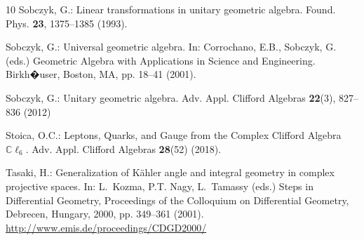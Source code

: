 \documentclass{birkjour}
\theoremstyle{definition}
\begin{document}
\begin{thebibliography}{10}
	Sobczyk, G.: Linear transformations in unitary geometric algebra.
	\newblock Found. Phys. \textbf{23}, 1375--1385 (1993).
	\newblock {}
	
	Sobczyk, G.: Universal geometric algebra.
	\newblock In: Corrochano, E.B., Sobczyk, G. (eds.) Geometric Algebra with Applications in Science and Engineering. Birkh�user, Boston, MA, pp. 18--41 (2001).
	
	Sobczyk, G.: Unitary geometric algebra.
	\newblock Adv. Appl. Clifford Algebras \textbf{22}(3), 827--836 (2012)
	
	Stoica, O.C.: Leptons, Quarks, and Gauge from the Complex Clifford Algebra $\mathbb {C}\ell _6$.
	\newblock Adv. Appl. Clifford Algebras \textbf{28}(52) (2018).
	\newblock {}
	
	Tasaki, H.: Generalization of {K}{\"a}hler angle and integral geometry in	complex projective spaces.
	\newblock In: L.~Kozma, P.T. Nagy, L.~Tamassy (eds.) Steps in Differential Geometry, Proceedings of the Colloquium on Differential Geometry, Debrecen, Hungary, 2000, pp. 349--361 (2001).
	\newblock \urlprefix\url{http://www.emis.de/proceedings/CDGD2000/}
	
	
\end{thebibliography}
\end{document}
